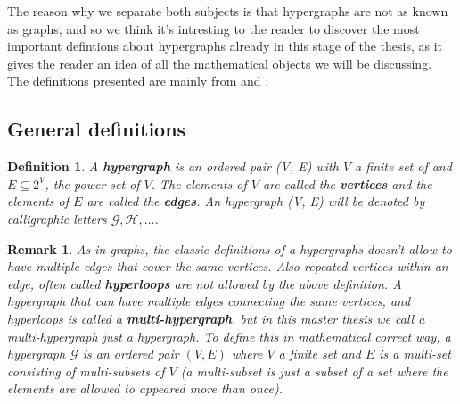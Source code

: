 \documentclass[a4paper,11pt]{report}
\newtheorem{definition}[theorem]{Definition}
\newtheorem{remark}[theorem]{Remark}
\newcommand{\hgraf}{\mathcal{G}}
\begin{document}
The reason why we separate both subjects is that hypergraphs are not as known as graphs, and so we think it's 
intresting to the reader to discover the most important defintions about 
hypergraphs already in this stage of the thesis, as it gives the reader an idea of all the mathematical objects we 
will be discussing. The definitions presented are mainly from \cite{berge} and 
\cite{hypper}.

\subsection{General definitions}
\begin{definition}
  A \textbf{hypergraph} is an ordered pair (V, E) with $V$ a finite set of 
and $E \subseteq 2^V$, the power set of $V$. The elements of $V$ are called
the \textbf{vertices} and the elements of $E$ are called the \textbf{edges}.
An hypergraph (V, E) will be denoted by calligraphic letters $\mathcal{G}, \mathcal{H},\ldots$.  
  \end{definition}

\begin{remark}
  As in graphs, the classic definitions of a hypergraphs doesn't allow to have 
  multiple edges that cover the same vertices. Also repeated vertices within an edge, often called \textbf{hyperloops} are not allowed 
  by the above definition. A hypergraph that can have multiple edges connecting 
  the same vertices, and hyperloops is called a \textbf{multi-hypergraph}, but 
  in this master thesis we call a multi-hypergraph just a hypergraph. To define 
  this in mathematical correct way, a hypergraph $\hgraf$ is an ordered
 pair $(V,E)$ where $V$ a finite set and $E$ is a multi-set consisting of 
multi-subsets of $V$ (a multi-subset is just a subset of a set where the elements are 
allowed to appeared more than once).
\end{remark}
\end{document}
